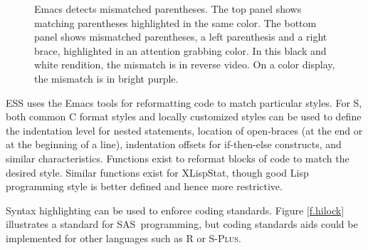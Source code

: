 \documentclass{article}
\newcommand*{\SAS}{\textsc{SAS}}
\newcommand*{\Splus}{\textsc{S-Plus}}
\newcommand{\stexttt}[1]{{\small\texttt{#1}}}
\begin{document}
\begin{figure}[tbp]%
  \caption{Emacs detects mismatched parentheses.  The top panel
shows matching parentheses highlighted in the same color.
The bottom panel shows mismatched parentheses, a left parenthesis
and a right brace, highlighted in an attention grabbing color.
In this black and white rendition, the mismatch is in reverse video.
On a color display, the mismatch is in bright purple.
    }
  \label{f.font}
\end{figure}

ESS uses the Emacs tools for reformatting code to match particular
styles.  For S, both common C format styles and locally customized
styles can be used to define the indentation level for nested
statements, location of open-braces (at the end or at the beginning of
a line), indentation offsets for if-then-else constructs, and similar
characteristics.  Functions exist to reformat blocks of code to match
the desired style.  Similar functions exist for XLispStat, though good
Lisp programming style is better defined and hence more restrictive.

Syntax highlighting can be used to enforce coding standards.  Figure
\ref{f.hilock} illustrates a standard for \SAS\ programming, but
coding standards aids could be implemented for other languages such as
R or \Splus.

\end{document}
